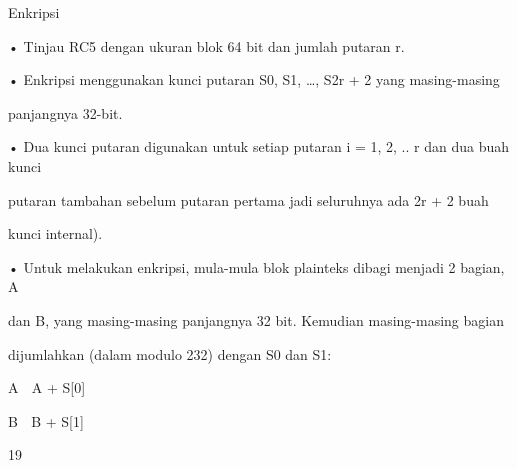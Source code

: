 \documentclass{article}
\begin{document}

Enkripsi

• Tinjau RC5 dengan ukuran blok 64 bit dan jumlah putaran r. 

• Enkripsi menggunakan kunci putaran S0, S1, …, S2r + 2 yang masing-masing 

panjangnya 32-bit. 

• Dua kunci putaran digunakan untuk setiap putaran i = 1, 2, .. r dan dua buah kunci 

putaran tambahan sebelum putaran pertama jadi seluruhnya ada 2r + 2 buah 

kunci internal). 

• Untuk melakukan enkripsi, mula-mula blok plainteks dibagi menjadi 2 bagian, A 

dan B, yang masing-masing panjangnya 32 bit. Kemudian masing-masing bagian 

dijumlahkan (dalam modulo 232) dengan S0 dan S1:



A  A + S[0]



B  B + S[1]

19
\end{document}
